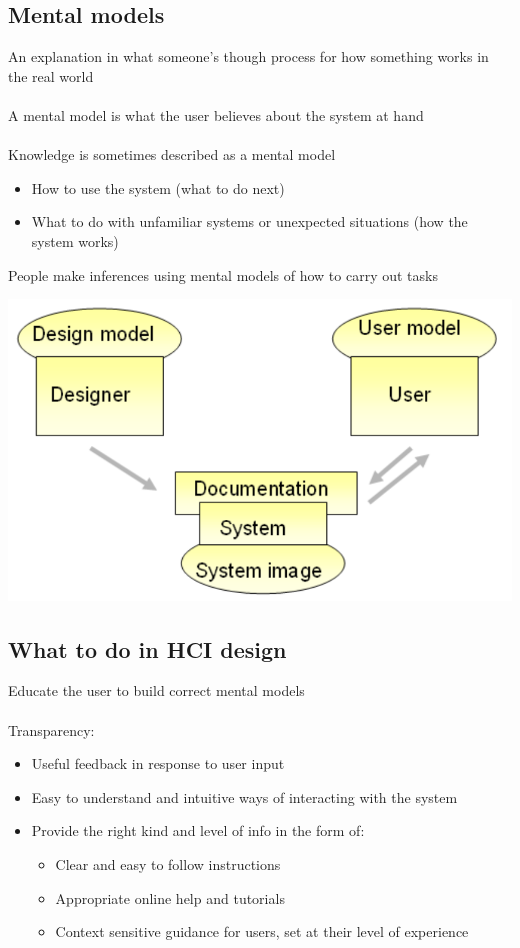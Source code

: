 \documentclass{article}[18pt]
\begin{document}
\subsection{Mental models}
An explanation in what someone's though process for how something works in the real world\\
\\
A mental model is what the user believes about the system at hand\\
\\
Knowledge is sometimes described as a mental model
\begin{itemize}
	\item How to use the system (what to do next)
	\item What to do with unfamiliar systems or unexpected situations (how the system works)
\end{itemize}
People make inferences using mental models of how to carry out tasks
\begin{center}
	\includegraphics[scale=0.7]{Conceptual}
\end{center}
\subsection{What to do in HCI design}
Educate the user to build correct mental models\\
\\
Transparency:
\begin{itemize}
	\item Useful feedback in response to user input
	\item Easy to understand and intuitive ways of interacting with the system
	\item Provide the right kind and level of info in the form of:
	\begin{itemize}
		\item Clear and easy to follow instructions
		\item Appropriate online help and tutorials
		\item Context sensitive guidance for users, set at their level of experience 
	\end{itemize}
\end{itemize}
\end{document}
